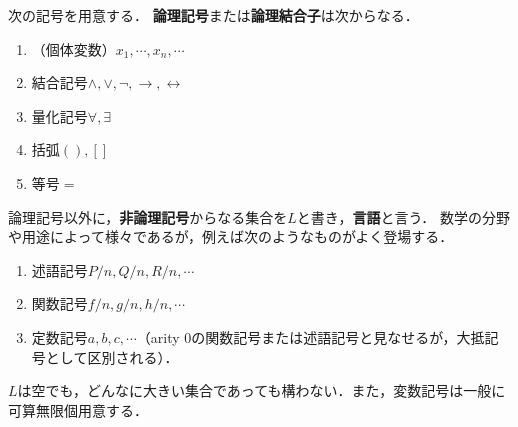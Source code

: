 \documentclass[uplatex, dvipdfmx]{jsreport}
\begin{document}
\begin{definition}[language]
    次の記号を用意する．
    \textbf{論理記号}または\textbf{論理結合子}は次からなる．
    \begin{enumerate}
        \item （個体変数）$x_1,\cdots,x_n,\cdots$
        \item 結合記号$\land,\lor,\lnot,\to,\leftrightarrow$
        \item 量化記号$\forall,\exists$
        \item 括弧$(),[]$
        \item 等号$=$
    \end{enumerate}
    論理記号以外に，\textbf{非論理記号}からなる集合を$L$と書き，\textbf{言語}と言う．
    数学の分野や用途によって様々であるが，例えば次のようなものがよく登場する．
    \begin{enumerate}
        \item 述語記号$P/n,Q/n,R/n,\cdots$
        \item 関数記号$f/n,g/n,h/n,\cdots$
        \item 定数記号$a,b,c,\cdots$（arity 0の関数記号または述語記号と見なせるが，大抵記号として区別される）．
    \end{enumerate}
\end{definition}
\begin{remark}
    $L$は空でも，どんなに大きい集合であっても構わない．また，変数記号は一般に可算無限個用意する．
\end{remark}
\end{document}
